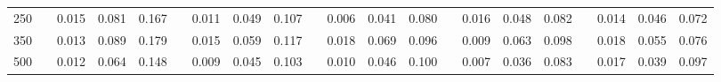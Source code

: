% 
\begin{tabular}{ccccccccccccccccccccc}
  \hline
  \hline
250 &  & 0.015 & 0.081 & 0.167 &  & 0.011 & 0.049 & 0.107 &  & 0.006 & 0.041 & 0.080 &  & 0.016 & 0.048 & 0.082 &  & 0.014 & 0.046 & 0.072 \\ 
  350 &  & 0.013 & 0.089 & 0.179 &  & 0.015 & 0.059 & 0.117 &  & 0.018 & 0.069 & 0.096 &  & 0.009 & 0.063 & 0.098 &  & 0.018 & 0.055 & 0.076 \\ 
  500 &  & 0.012 & 0.064 & 0.148 &  & 0.009 & 0.045 & 0.103 &  & 0.010 & 0.046 & 0.100 &  & 0.007 & 0.036 & 0.083 &  & 0.017 & 0.039 & 0.097 \\ 
   \hline
\end{tabular}

